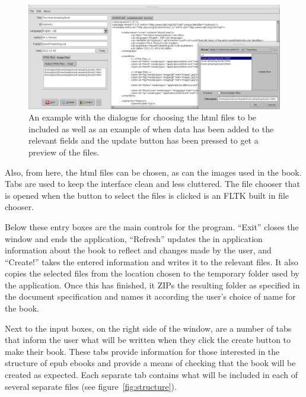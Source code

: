 \documentclass[11pt]{article} %
\begin{document}
\begin{figure}[ht]
  \centering
  \includegraphics[width=0.9\columnwidth]{example.png}
  \caption{\label{fig:example}An example with the dialogue for choosing the html files to be included as well as an example of when data has been added to the relevant fields and the update button has been pressed to get a preview of the files.} 
\end{figure}

%    

Also, from here, the html files can be chosen, as can the images used in the book. Tabs are used to keep the interface clean and less cluttered. The file chooser that is opened when the button to select the files is clicked is an FLTK built in file chooser.

Below these entry boxes are the main controls for the program. ``Exit'' closes the window and ends the application, ``Refresh'' updates the in application information about the book to reflect and changes made by the user, and ``Create!'' takes the entered information and writes it to the relevant files. It also copies the selected files from the location chosen to the temporary folder used by the application. Once this has finished, it ZIPs the resulting folder as specified in the document specification and names it according the user's choice of name for the book.

Next to the input boxes, on the right side of the window, are a number of tabs that inform the user what will be written when they click the create button to make their book. These tabs provide information for those interested in the structure of epub ebooks and provide a means of checking that the book will be created as expected. Each separate tab contains what will be included in each of several separate files (see figure~\ref{fig:structure}).
\end{document}
